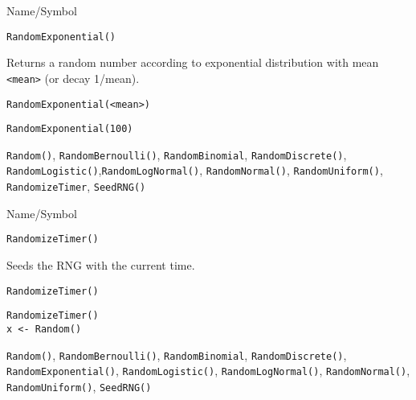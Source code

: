 \rl


\begin{desc}{Name/Symbol}
\item[Name/Symbol]	\verb+RandomExponential()+

\item[Description]	Returns a random number according to exponential 
		distribution with mean \verb+<mean>+ (or decay 1/mean).

\item[Usage]		
\begin{verbatim}
RandomExponential(<mean>)
\end{verbatim}

\item[Example]	
\begin{verbatim}
RandomExponential(100)
\end{verbatim}

\item[See Also]	\verb+Random()+, \verb+RandomBernoulli()+, \verb+RandomBinomial+,
		\verb+RandomDiscrete()+, \verb+RandomLogistic()+,\verb+RandomLogNormal()+, 
		\verb+RandomNormal()+, \verb+RandomUniform()+, \verb+RandomizeTimer+, \verb+SeedRNG()+
\end{desc}

\rl                            


\begin{desc}{Name/Symbol}
\item[Name/Symbol]	\verb+RandomizeTimer()+

\item[Description]	Seeds the RNG with the current time.

\item[Usage]
\begin{verbatim}
RandomizeTimer()
\end{verbatim}

\item[Example]	
\begin{verbatim}
RandomizeTimer()
x <- Random()
\end{verbatim}
	     
\item[See Also]	\verb+Random()+, \verb+RandomBernoulli()+, \verb+RandomBinomial+,
		\verb+RandomDiscrete()+, \verb+RandomExponential()+, \verb+RandomLogistic()+,
		\verb+RandomLogNormal()+, \verb+RandomNormal()+, \verb+RandomUniform()+, \verb+SeedRNG()+
\end{desc}

\rl


